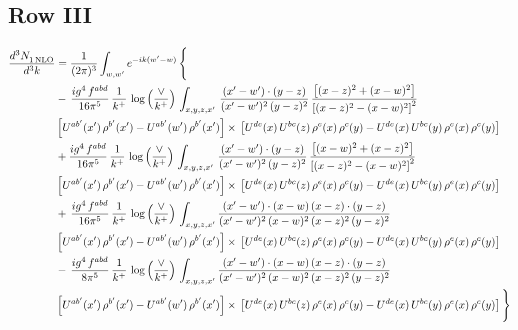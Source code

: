 \documentclass[9pt]{article}
\numberwithin{equation}{section}
\begin{document}
\subsection{Row III}
\begin{align}
   \frac{d^{3}N_{1\,\rm NLO}^{\rm}}{d^{3}k}  & =  \frac{1}{(2\pi)^{3}}  \int_{w, w^\prime} e^{-ik(w^\prime-w)}\, \Bigg\{\notag \\
& -\,\frac{ig^{4}\,f^{abd}}{16\pi^{5}}\,\frac{1}{k^{+}}\,\log{\left(\frac{\vee}{k^{+}}\right)}\,\int_{x,y,z,x'}\, \frac{(x'-w')\cdot (y-z)}{(x'-w')^{2}\,(y-z)^{2}}\,\frac{\left[(x-z)^{2}+(x-w)^{2}\right]}{\left[(x-z)^{2}-(x-w)^{2}\right]^{2}}\notag \\ & \left[U^{ab'}(x')\,\rho^{b'}(x')-U^{ab'}(w')\, \rho^{b'}(x')\right]\times\, \left[U^{de}(x)\,U^{bc}(z)\, \rho^{e}(x)\,\rho^{c}(y)-U^{de}(x)\,U^{bc}(y)\,\rho^{e}(x)\,\rho^{c}(y)\right] \notag \\
&  +\frac{ig^{4}\,f^{abd}}{16\pi^{5}}\, \frac{1}{k^{+}}\,\log{\left(\frac{\vee}{k^{+}}\right)}\,\int_{x,y,z,x'}\, \frac{(x'-w')\cdot (y-z)}{(x'-w')^{2}\,(y-z)^{2}}\, \frac{\left[(x-w)^{2}+(x-z)^{2}\right]}{\left[(x-z)^{2}-(x-w)^{2}\right]^{2}}\notag \\ & \left[U^{ab'}(x')\,\rho^{b'}(x')-U^{ab'}(w')\, \rho^{b'}(x')\right]\times\, \left[U^{de}(x)\,U^{bc}(z)\, \rho^{e}(x)\,\rho^{c}(y)-U^{de}(x)\,U^{bc}(y)\,\rho^{e}(x)\,\rho^{c}(y)\right] \notag \\
& +\, \frac{ig^{4}\,f^{abd}}{16\pi^{5}}\,\frac{1}{k^{+}}\,\log{\left(\frac{\vee}{k^{+}}\right)}\,\int_{x,y,z,x'} \frac{(x'-w')\cdot (x-w)\, (x-z)\cdot (y-z)}{(x'-w')^{2}\, (x-w)^{2}\, (x-z)^{2}\, (y-z)^{2}}\, \notag \\ & \left[U^{ab'}(x')\,\rho^{b'}(x')-U^{ab'}(w')\, \rho^{b'}(x')\right]\times\, \left[U^{de}(x)\,U^{bc}(z)\, \rho^{e}(x)\,\rho^{c}(y)-U^{de}(x)\,U^{bc}(y)\,\rho^{e}(x)\,\rho^{c}(y)\right] \notag \\
&-\, \frac{ig^{4}\,f^{abd}}{8\pi^{5}}\,\frac{1}{k^{+}}\,\log{\left(\frac{\vee}{k^{+}}\right)}\,\int_{x,y,z,x'}\frac{(x'-w')\cdot (x-w)\, (x-z)\cdot (y-z)}{(x'-w')^{2}\, (x-w)^{2}\, (x-z)^{2}\, (y-z)^{2}} \notag \\ & \left[U^{ab'}(x')\,\rho^{b'}(x')-U^{ab'}(w')\, \rho^{b'}(x')\right]\times\, \left[U^{de}(x)\,U^{bc}(z)\, \rho^{e}(x)\,\rho^{c}(y)-U^{de}(x)\,U^{bc}(y)\,\rho^{e}(x)\,\rho^{c}(y)\right]\Bigg\}
\end{align}
\end{document}
